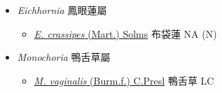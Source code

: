 
  \begin{itemize}
 \item[] \textit{Eichhornia} 鳳眼蓮屬
                                
  \begin{itemize}
        \item[] \href{http://www.theplantlist.org/tpl1.1/search?q=Eichhornia+crassipes}{\textit{E. crassipes} (Mart.) Solms}   布袋蓮   NA (N)
  \end{itemize}
 \item[] \textit{Monochoria} 鴨舌草屬
                                
  \begin{itemize}
        \item[] \href{http://www.theplantlist.org/tpl1.1/search?q=Monochoria+vaginalis}{\textit{M. vaginalis} (Burm.f.) C.Presl}   鴨舌草   LC
  \end{itemize}
  \end{itemize}
